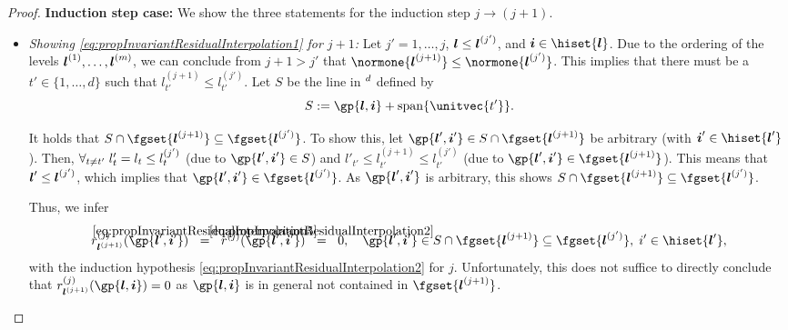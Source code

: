 \begin{proof}
  \noindent
  \textbf{Induction step case:}
  We show the three statements for the induction step $j \to (j + 1)$.
  \begin{itemize}
    \item
    \emph{Showing \eqref{eq:propInvariantResidualInterpolation1} for $j + 1$:}
    Let $j' = 1, \dotsc, j$, ${\boldsymbol{l}} \le {\boldsymbol{l}}^{(j')}$,
    and $\*i \in \hiset{\*l}$.
    Due to the ordering of the levels ${\boldsymbol{l}}^{(1)}, \dotsc, {\boldsymbol{l}}^{(m)}$,
    we can conclude from $j + 1 > j'$ that
    $\normone{\*l^{(j+1)}} \le \normone{\*l^{(j')}}$.
    This implies that there must be a $t' \in \{1, \dotsc, d\}$
    such that $l_{t'}^{(j+1)} \le l_{t'}^{(j')}$.
    Let $S$ be the line in $\real^d$ defined by
    \begin{equation}
      S
      := \gp{\*l,\*i} + \spn\{\unitvec{t'}\}.
    \end{equation}
    
    It holds that $S \cap \fgset{\*l^{(j+1)}} \subset \fgset{\*l^{(j')}}$.
    To show this, let $\gp{\*l',\*i'} \in S \cap \fgset{\*l^{(j+1)}}$
    be arbitrary (with $\*i' \in \hiset{\*l'}$).
    Then, $\forall_{t \not= t'}\;l'_t = l_t \le l_t^{(j')}$
    (due to $\gp{\*l',\*i'} \in S$) and
    $l'_{t'} \le l_{t'}^{(j+1)} \le l_{t'}^{(j')}$
    (due to $\gp{\*l',\*i'} \in \fgset{\*l^{(j+1)}}$).
    This means that ${\boldsymbol{l}}' \le {\boldsymbol{l}}^{(j')}$, which implies that
    $\gp{\*l',\*i'} \in \fgset{\*l^{(j')}}$.
    As $\gp{\*l',\*i'}$ is arbitrary,
    this shows $S \cap \fgset{\*l^{(j+1)}} \subset \fgset{\*l^{(j')}}$.
    
    Thus, we infer
    \begin{equation}
      \label{eq:proofPropInvariantResidualInterpolation2}
      r_{\*l^{(j+1)}}^{(j)}(\gp{\*l',\*i'})
      \eqwithref{5}
      r^{(j)}(\gp{\*l',\*i'})
      \eqwithref{2}
      0,\quad
      \gp{\*l',\*i'} \in S \cap \fgset{\*l^{(j+1)}}
      \subset \fgset{\*l^{(j')}},\;
      i' \in \hiset{\*l'},
    \end{equation}
    with the induction hypothesis
    \eqref{eq:propInvariantResidualInterpolation2} for $j$.
    Unfortunately, this does not suffice to directly conclude that
    $r_{\*l^{(j+1)}}^{(j)}(\gp{\*l,\*i}) = 0$ as
    $\gp{\*l,\*i}$ is in general not contained in $\fgset{\*l^{(j+1)}}$.
    

\end{itemize}
\end{proof}
